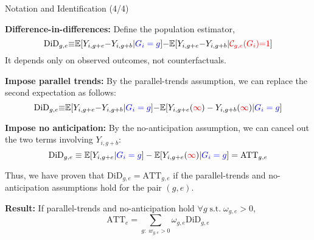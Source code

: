 \documentclass[usenames,dvipsnames]{beamer}
\begin{document}
\begin{frame}{Notation and Identification (4/4)}

\textbf{Difference-in-differences:} Define the population estimator,
\begin{equation} \notag 
\text{DiD}_{g,e} {\equiv}  \mathbb{E}[Y_{i,g+e} {-} Y_{i,g+b} | {\color{blue} G_i = g }] {-}
\mathbb{E}[Y_{i,g+e} {-} Y_{i,g+b} | {\color{red} \mathcal{C}_{g,e}(G_i)  {=} 1}]
\end{equation}
It depends only on observed outcomes, not counterfactuals.

\textbf{Impose parallel trends:}  By the parallel-trends assumption, we can replace the second expectation as follows:
\begin{equation} \notag 
\text{DiD}_{g,e} {\equiv}  \mathbb{E}[Y_{i,g+e} {-} Y_{i,g+b} | {\color{blue} G_i = g }] {-}
\mathbb{E}[Y_{i,g+e}({\color{red} \infty}) - Y_{i,g+b}({\color{red} \infty}) | {\color{blue}G_i = g}]
\end{equation}

\textbf{Impose no anticipation:} By the no-anticipation assumption, we can cancel out the two terms involving $Y_{i,g+b}$:
\begin{equation} \notag 
\text{DiD}_{g,e} \equiv  \mathbb{E}[Y_{i,g+e}  | {\color{blue} G_i = g }] -
\mathbb{E}[Y_{i,g+e}({\color{red} \infty})  | {\color{blue}G_i = g}]
=
\text{ATT}_{g,e}
\end{equation}

\vspace{-0.05cm}

Thus, we have proven that $\text{DiD}_{g,e}=\text{ATT}_{g,e}$ if the parallel-trends and no-anticipation assumptions hold for the pair $(g,e)$. 

\textbf{Result:} If  parallel-trends and no-anticipation hold $\forall g \; \text{s.t.} \; \omega_{g,e}>0$, $$\text{ATT}_{e} = \sum_{g:\; w_{g,e}>0} \omega_{g,e} \text{DiD}_{g,e} $$

\vspace{-0.05cm}

\end{frame}


 
\end{document}
